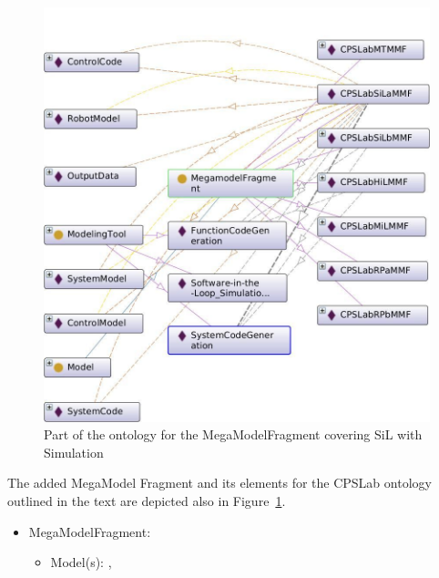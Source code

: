 \begin{figure}[!htb]
\centering
\includegraphics[scale=0.333]{figures/CPSLabSiLaMMF.jpg}
\caption{Part of the ontology for the MegaModelFragment \CPSLabSiLaMMF covering SiL with Simulation}
\label{fig:CPSLabSiLaMMF}
\end{figure}

The added MegaModel Fragment \CPSLabSiLaMMF and its elements for the CPSLab ontology outlined in the text are depicted also in Figure~\ref{fig:CPSLabSiLaMMF}.




\begin{itemize}
    \item MegaModelFragment: \CPSLabSiLbMMF
    \begin{itemize}
        \item Model(s): \CPSLabControlModel*, \CPSLabSystemModel
    \end{itemize}
\end{itemize}

